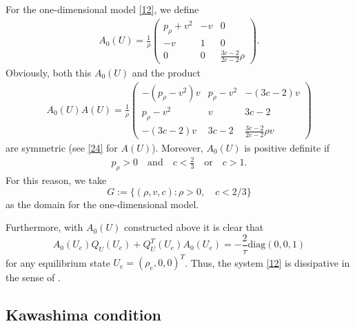 \documentclass{article}
\theoremstyle{plain}
\begin{document}
For the one-dimensional model \eqref{12}, we define
\begin{eqnarray}\label{31}
A_0(U) = \frac{1}{\rho} \left( \begin{array}{ccc}
	 p_\rho  +v^2 & -v & 0 \\ [2mm]
	-v & 1 & 0 \\[2mm]
	0 & 0 & \frac{3c-2}{2c-2}\rho  \end{array} \right).
\end{eqnarray}
Obviously, both this $A_0(U)$ and the product
\begin{eqnarray*}
A_0(U) A(U) = \frac{1}{\rho} \left( \begin{array}{ccc}
		-(p_{\rho}-v^2)v & {p_\rho -v^2} & -{(3c-2)v} \\[2mm]
		{p_\rho-v^2} & {v} & {3c-2} \\[2mm]
		-{(3c-2)v} & {3c-2} & \frac{3c-2}{2c-2}\rho v
		\end{array} \right)
\end{eqnarray*}
are symmetric (see \eqref{24} for $A(U)$). Moreover, $A_0(U)$ is positive definite if
\begin{eqnarray*}
p_\rho > 0 \quad \mbox{and} \quad c < \frac{2}{3} \quad \mbox{or} \quad  c > 1 .
\end{eqnarray*}
For this reason, we take
\begin{equation}\label{37}
G := \{(\rho, v, c): \rho>0, \quad c< 2/3\}
\end{equation}
as the domain for the one-dimensional model.


Furthermore, with $A_0(U)$ constructed above it is clear that
\begin{equation}\label{32}
A_0(U_e)Q_U(U_e) + Q_U^T(U_e)A_0(U_e) =-\frac{2}{\tau}\mbox{diag}(0, 0, 1)
\end{equation}
for any equilibrium state $U_e = (\rho_e, 0, 0)^T$. Thus, the system \eqref{12} is dissipative in the sense of \cite{yong1992singular,yong1999singular}.

\subsection{Kawashima condition}
\end{document}
